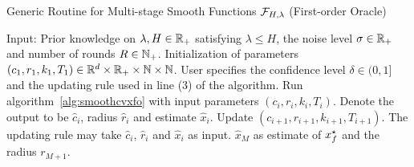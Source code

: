 \begin{algorithm}[htp]
\caption{Generic Routine for Multi-stage Smooth Functions $\mathcal{F}_{H, \lambda}$ (First-order Oracle)} 
\begin{algorithmic}[1]  
\Statex Input: Prior knowledge on $\lambda, H \in \mathbb{R}_+$ satisfying $\lambda \leq H$, 
	the noise level $\sigma \in \mathbb{R}_+$ and number of rounds $R \in \mathbb{N}_+$. 
	Initialization of parameters $(c_1, r_1, k_1, T_1) \in \mathbb{R}^d \times \mathbb{R}_+ \times \mathbb{N} \times \mathbb{N}$. 
	User specifies the confidence level $\delta \in (0, 1]$ and the updating rule used in line 
	(3) of the algorithm.
	\State Run algorithm~\ref{alg:smoothcvxfo} with input parameters $(c_i, r_i, k_i, T_i)$.
		Denote the output to be $\hat{c}_i$, radius $\hat{r}_i$ and estimate $\hat{x}_i$.
	\State Update $(c_{i+1}, r_{i+1}, k_{i+1}, T_{i+1})$. The updating 
		rule may take $\hat{c}_i$, $\hat{r}_i$ and $\hat{x}_i$ as input. 
\ENDFOR
\State \Return $\hat{x}_M$ as estimate of $x_f^\star$ and the radius $r_{M+1}$.
\end{algorithmic}
\label{alg:smoothcvxfoRrounds}
\end{algorithm} 
%
